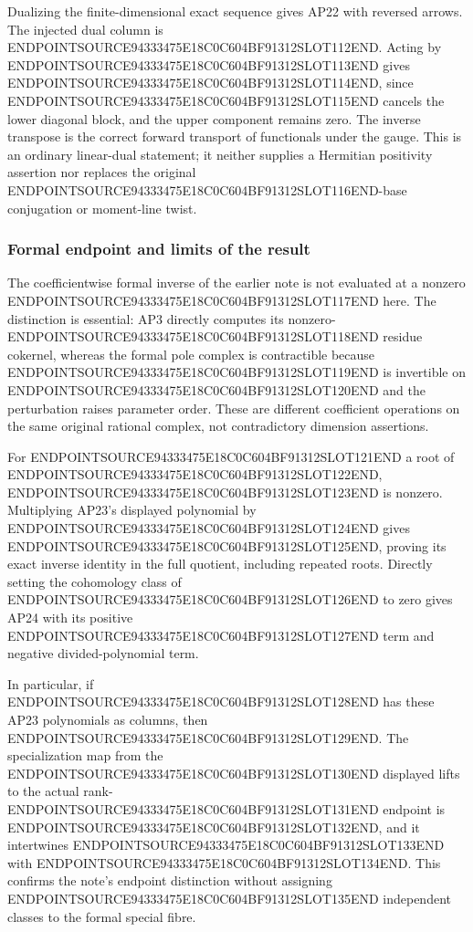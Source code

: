 Dualizing the finite-dimensional exact sequence gives AP22 with reversed arrows. The injected dual column is ENDPOINTSOURCE94333475E18C0C604BF91312SLOT112END. Acting by ENDPOINTSOURCE94333475E18C0C604BF91312SLOT113END gives ENDPOINTSOURCE94333475E18C0C604BF91312SLOT114END, since ENDPOINTSOURCE94333475E18C0C604BF91312SLOT115END cancels the lower diagonal block, and the upper component remains zero. The inverse transpose is the correct forward transport of functionals under the gauge. This is an ordinary linear-dual statement; it neither supplies a Hermitian positivity assertion nor replaces the original ENDPOINTSOURCE94333475E18C0C604BF91312SLOT116END-base conjugation or moment-line twist.

\subsubsection{Formal endpoint and limits of the result}\label{endpoint-analytic_pole_review--formal-endpoint-and-limits-of-the-result}

The coefficientwise formal inverse of the earlier note is not evaluated at a nonzero ENDPOINTSOURCE94333475E18C0C604BF91312SLOT117END here. The distinction is essential: AP3 directly computes its nonzero-ENDPOINTSOURCE94333475E18C0C604BF91312SLOT118END residue cokernel, whereas the formal pole complex is contractible because ENDPOINTSOURCE94333475E18C0C604BF91312SLOT119END is invertible on ENDPOINTSOURCE94333475E18C0C604BF91312SLOT120END and the perturbation raises parameter order. These are different coefficient operations on the same original rational complex, not contradictory dimension assertions.

For ENDPOINTSOURCE94333475E18C0C604BF91312SLOT121END a root of ENDPOINTSOURCE94333475E18C0C604BF91312SLOT122END, ENDPOINTSOURCE94333475E18C0C604BF91312SLOT123END is nonzero. Multiplying AP23's displayed polynomial by ENDPOINTSOURCE94333475E18C0C604BF91312SLOT124END gives ENDPOINTSOURCE94333475E18C0C604BF91312SLOT125END, proving its exact inverse identity in the full quotient, including repeated roots. Directly setting the cohomology class of ENDPOINTSOURCE94333475E18C0C604BF91312SLOT126END to zero gives AP24 with its positive ENDPOINTSOURCE94333475E18C0C604BF91312SLOT127END term and negative divided-polynomial term.

In particular, if ENDPOINTSOURCE94333475E18C0C604BF91312SLOT128END has these AP23 polynomials as columns, then ENDPOINTSOURCE94333475E18C0C604BF91312SLOT129END. The specialization map from the ENDPOINTSOURCE94333475E18C0C604BF91312SLOT130END displayed lifts to the actual rank-ENDPOINTSOURCE94333475E18C0C604BF91312SLOT131END endpoint is ENDPOINTSOURCE94333475E18C0C604BF91312SLOT132END, and it intertwines ENDPOINTSOURCE94333475E18C0C604BF91312SLOT133END with ENDPOINTSOURCE94333475E18C0C604BF91312SLOT134END. This confirms the note's endpoint distinction without assigning ENDPOINTSOURCE94333475E18C0C604BF91312SLOT135END independent classes to the formal special fibre.


